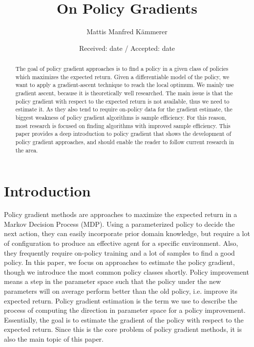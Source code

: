 \documentclass[final]{IEEEtran}
\begin{document}
\title{On Policy Gradients}

\author {Mattis Manfred K{\"a}mmerer}
\date{Received: date / Accepted: date}

\maketitle

\begin{abstract}

The goal of policy gradient approaches is to find a policy in a given class of policies which maximizes the expected return.
Given a differentiable model of the policy, we want to apply a gradient-ascent technique to reach the local optimum. 
We mainly use gradient ascent, because it is theoretically well researched.
The main issue is that the policy gradient with respect to the expected return is not available, thus we need to estimate it.
As they also tend to require on-policy data for the gradient estimate, the biggest weakness of policy gradient algorithms is sample efficiency.
For this reason, most research is focused on finding algorithms with improved sample efficiency.
This paper provides a deep introduction to policy gradient that shows the development of policy gradient approaches, and should enable the reader to follow current research in the area.
\end{abstract}

\section{Introduction}
\label{intro}

Policy gradient methods are approaches to maximize the expected return in a Markov Decision Process (MDP). 
Using a parameterized policy to decide the next action, they can easily incorporate prior domain knowledge, but require a lot of configuration to produce an effective agent for a specific environment. 
Also, they frequently require on-policy training and a lot of samples to find a good policy. 
In this paper, we focus on approaches to estimate the policy gradient, though we introduce the most common policy classes shortly.
Policy improvement means a step in the parameter space such that the policy under the new parameters will on average perform better than the old policy, i.e. improve its expected return. 
Policy gradient estimation is the term we use to describe the process of computing the direction in parameter space for a policy improvement. 
Essentially, the goal is to estimate the gradient of the policy with respect to the expected return. 
Since this is the core problem of policy gradient methods, it is also the main topic of this paper.
\end{document}
